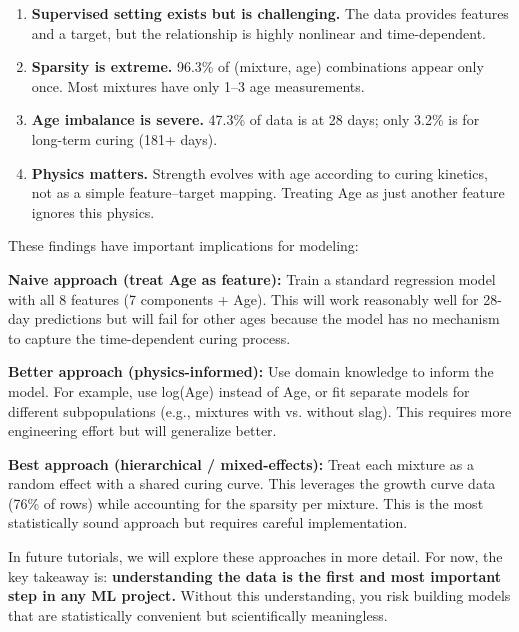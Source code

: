 \documentclass[11pt]{article}
\begin{document}
\begin{enumerate}[nosep]
  \item \textbf{Supervised setting exists but is challenging.}  The data provides features and a target, but the relationship is highly nonlinear and time-dependent.
  
  \item \textbf{Sparsity is extreme.}  96.3\% of (mixture, age) combinations appear only once.  Most mixtures have only 1--3 age measurements.
  
  \item \textbf{Age imbalance is severe.}  47.3\% of data is at 28 days; only 3.2\% is for long-term curing (181+ days).
  
  \item \textbf{Physics matters.}  Strength evolves with age according to curing kinetics, not as a simple feature--target mapping.  Treating Age as just another feature ignores this physics.
\end{enumerate}

These findings have important implications for modeling:

\begin{def-box}
\textbf{Naive approach (treat Age as feature):}  Train a standard regression model with all 8 features (7 components + Age).  This will work reasonably well for 28-day predictions but will fail for other ages because the model has no mechanism to capture the time-dependent curing process.
\end{def-box}

\begin{def-box}
\textbf{Better approach (physics-informed):}  Use domain knowledge to inform the model.  For example, use log(Age) instead of Age, or fit separate models for different subpopulations (e.g., mixtures with vs. without slag).  This requires more engineering effort but will generalize better.
\end{def-box}

\begin{def-box}
\textbf{Best approach (hierarchical / mixed-effects):}  Treat each mixture as a random effect with a shared curing curve.  This leverages the growth curve data (76\% of rows) while accounting for the sparsity per mixture.  This is the most statistically sound approach but requires careful implementation.
\end{def-box}

In future tutorials, we will explore these approaches in more detail.  For now, the key takeaway is: \textbf{understanding the data is the first and most important step in any ML project.}  Without this understanding, you risk building models that are statistically convenient but scientifically meaningless.
\end{document}

